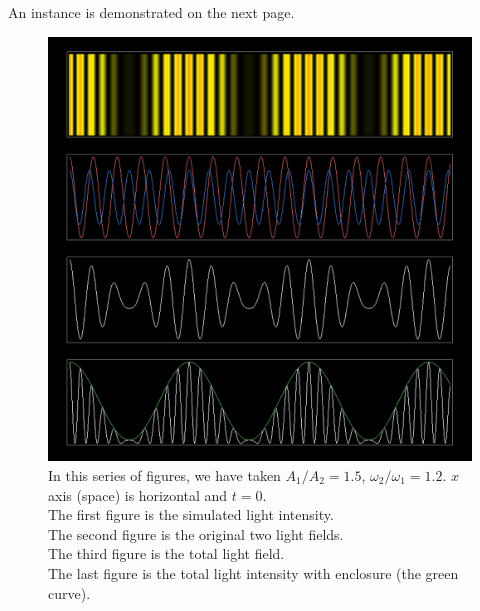 \documentclass[12pt, twoside]{article}   	%
\theoremstyle{plain}
\theoremstyle{definition}
\begin{document}
	An instance is demonstrated on the next page.

	\begin{figure}[htbp]
		\centering
		\includegraphics[width=\linewidth]{LightBeat}
		\caption{In this series of figures, we have taken $A_1 / A_2 = 1.5$, $\omega_2 / \omega_1
		= 1.2$. $x$ axis (space) is horizontal and $t = 0$. \\ The first figure is the simulated
		light intensity. \\ The second figure is the original two light fields. \\ The third figure
		is the total light field. \\ The last figure is the total light intensity with enclosure
		(the green curve).}
	\end{figure}
	
	
\end{document}
